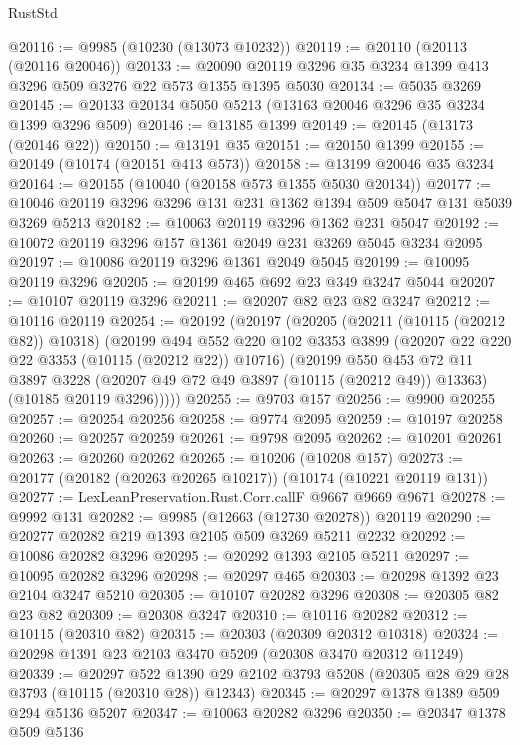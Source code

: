 \begin{lexlean}{RustStd}
\begin{coremodule}
@20116 := @9985 (@10230 (@13073 @10232))
@20119 := @20110 (@20113 (@20116 @20046))
@20133 := @20090 @20119 @3296 @35 @3234 @1399 @413 @3296 @509 @3276 @22 @573 @1355 @1395 @5030
@20134 := @5035 @3269
@20145 := @20133 @20134 @5050 @5213 (@13163 @20046 @3296 @35 @3234 @1399 @3296 @509)
@20146 := @13185 @1399
@20149 := @20145 (@13173 (@20146 @22))
@20150 := @13191 @35
@20151 := @20150 @1399
@20155 := @20149 (@10174 (@20151 @413 @573))
@20158 := @13199 @20046 @35 @3234
@20164 := @20155 (@10040 (@20158 @573 @1355 @5030 @20134))
@20177 := @10046 @20119 @3296 @3296 @131 @231 @1362 @1394 @509 @5047 @131 @5039 @3269 @5213
@20182 := @10063 @20119 @3296 @1362 @231 @5047
@20192 := @10072 @20119 @3296 @157 @1361 @2049 @231 @3269 @5045 @3234 @2095
@20197 := @10086 @20119 @3296 @1361 @2049 @5045
@20199 := @10095 @20119 @3296
@20205 := @20199 @465 @692 @23 @349 @3247 @5044
@20207 := @10107 @20119 @3296
@20211 := @20207 @82 @23 @82 @3247
@20212 := @10116 @20119
@20254 := @20192
    (@20197
      (@20205
        (@20211 (@10115 (@20212 @82)) @10318)
        (@20199
          @494
          @552
          @220
          @102
          @3353
          @3899
          (@20207 @22 @220 @22 @3353 (@10115 (@20212 @22)) @10716)
          (@20199
            @550
            @453
            @72
            @11
            @3897
            @3228
            (@20207 @49 @72 @49 @3897 (@10115 (@20212 @49)) @13363)
            (@10185 @20119 @3296)))))
@20255 := @9703 @157
@20256 := @9900 @20255
@20257 := @20254 @20256
@20258 := @9774 @2095
@20259 := @10197 @20258
@20260 := @20257 @20259
@20261 := @9798 @2095
@20262 := @10201 @20261
@20263 := @20260 @20262
@20265 := @10206 (@10208 @157)
@20273 := @20177 (@20182 (@20263 @20265 @10217)) (@10174 (@10221 @20119 @131))
@20277 := LexLeanPreservation.Rust.Corr.callF @9667 @9669 @9671
@20278 := @9992 @131
@20282 := @9985 (@12663 (@12730 @20278)) @20119
@20290 := @20277 @20282 @219 @1393 @2105 @509 @3269 @5211 @2232
@20292 := @10086 @20282 @3296
@20295 := @20292 @1393 @2105 @5211
@20297 := @10095 @20282 @3296
@20298 := @20297 @465
@20303 := @20298 @1392 @23 @2104 @3247 @5210
@20305 := @10107 @20282 @3296
@20308 := @20305 @82 @23 @82
@20309 := @20308 @3247
@20310 := @10116 @20282
@20312 := @10115 (@20310 @82)
@20315 := @20303 (@20309 @20312 @10318)
@20324 := @20298 @1391 @23 @2103 @3470 @5209 (@20308 @3470 @20312 @11249)
@20339 := @20297
    @522
    @1390
    @29
    @2102
    @3793
    @5208
    (@20305 @28 @29 @28 @3793 (@10115 (@20310 @28)) @12343)
@20345 := @20297 @1378 @1389 @509 @294 @5136 @5207
@20347 := @10063 @20282 @3296
@20350 := @20347 @1378 @509 @5136

\end{coremodule}
\end{lexlean}
